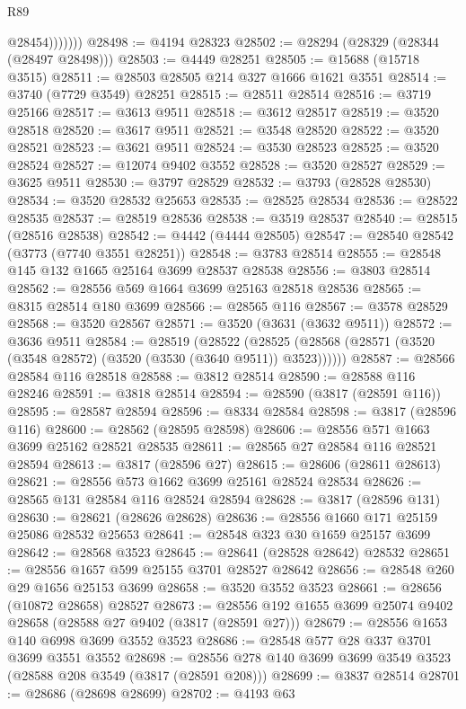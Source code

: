 \begin{lexlean}{R89}
\begin{coremodule}
                  @28454)))))))
@28498 := @4194 @28323
@28502 := @28294 (@28329 (@28344 (@28497 @28498)))
@28503 := @4449 @28251
@28505 := @15688 (@15718 @3515)
@28511 := @28503 @28505 @214 @327 @1666 @1621 @3551
@28514 := @3740 (@7729 @3549) @28251
@28515 := @28511 @28514
@28516 := @3719 @25166
@28517 := @3613 @9511
@28518 := @3612 @28517
@28519 := @3520 @28518
@28520 := @3617 @9511
@28521 := @3548 @28520
@28522 := @3520 @28521
@28523 := @3621 @9511
@28524 := @3530 @28523
@28525 := @3520 @28524
@28527 := @12074 @9402 @3552
@28528 := @3520 @28527
@28529 := @3625 @9511
@28530 := @3797 @28529
@28532 := @3793 (@28528 @28530)
@28534 := @3520 @28532 @25653
@28535 := @28525 @28534
@28536 := @28522 @28535
@28537 := @28519 @28536
@28538 := @3519 @28537
@28540 := @28515 (@28516 @28538)
@28542 := @4442 (@4444 @28505)
@28547 := @28540 @28542 (@3773 (@7740 @3551 @28251))
@28548 := @3783 @28514
@28555 := @28548 @145 @132 @1665 @25164 @3699 @28537 @28538
@28556 := @3803 @28514
@28562 := @28556 @569 @1664 @3699 @25163 @28518 @28536
@28565 := @8315 @28514 @180 @3699
@28566 := @28565 @116
@28567 := @3578 @28529
@28568 := @3520 @28567
@28571 := @3520 (@3631 (@3632 @9511))
@28572 := @3636 @9511
@28584 := @28519
    (@28522 (@28525 (@28568 (@28571 (@3520 (@3548 @28572) (@3520 (@3530 (@3640 @9511)) @3523))))))
@28587 := @28566 @28584 @116 @28518
@28588 := @3812 @28514
@28590 := @28588 @116 @28246
@28591 := @3818 @28514
@28594 := @28590 (@3817 (@28591 @116))
@28595 := @28587 @28594
@28596 := @8334 @28584
@28598 := @3817 (@28596 @116)
@28600 := @28562 (@28595 @28598)
@28606 := @28556 @571 @1663 @3699 @25162 @28521 @28535
@28611 := @28565 @27 @28584 @116 @28521 @28594
@28613 := @3817 (@28596 @27)
@28615 := @28606 (@28611 @28613)
@28621 := @28556 @573 @1662 @3699 @25161 @28524 @28534
@28626 := @28565 @131 @28584 @116 @28524 @28594
@28628 := @3817 (@28596 @131)
@28630 := @28621 (@28626 @28628)
@28636 := @28556 @1660 @171 @25159 @25086 @28532 @25653
@28641 := @28548 @323 @30 @1659 @25157 @3699
@28642 := @28568 @3523
@28645 := @28641 (@28528 @28642) @28532
@28651 := @28556 @1657 @599 @25155 @3701 @28527 @28642
@28656 := @28548 @260 @29 @1656 @25153 @3699
@28658 := @3520 @3552 @3523
@28661 := @28656 (@10872 @28658) @28527
@28673 := @28556 @192 @1655 @3699 @25074 @9402 @28658 (@28588 @27 @9402 (@3817 (@28591 @27)))
@28679 := @28556 @1653 @140 @6998 @3699 @3552 @3523
@28686 := @28548 @577 @28 @337 @3701 @3699 @3551 @3552
@28698 := @28556 @278 @140 @3699 @3699 @3549 @3523 (@28588 @208 @3549 (@3817 (@28591 @208)))
@28699 := @3837 @28514
@28701 := @28686 (@28698 @28699)
@28702 := @4193 @63

\end{coremodule}
\end{lexlean}
